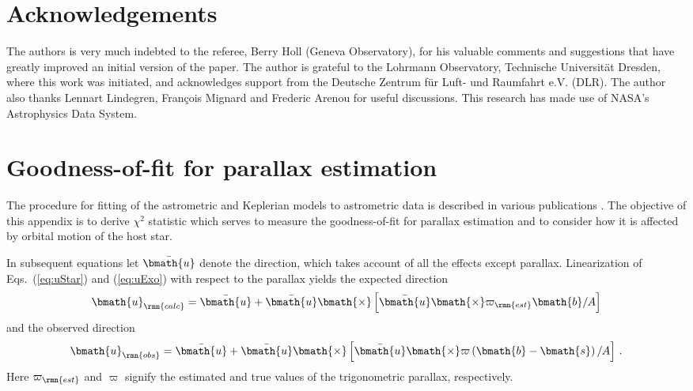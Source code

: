 \documentclass[fleqn,usenatbib,useAMS,usedcolumn]{mnras}
\begin{document}
\section*{Acknowledgements}

The authors is very much indebted to the referee, Berry Holl (Geneva Observatory), for his valuable comments and suggestions that have greatly improved an initial version of the paper. The author is grateful to the Lohrmann Observatory, Technische Universit\"at Dresden, where this work was initiated, and acknowledges support from the Deutsche Zentrum f\"ur Luft- und Raumfahrt e.V. (DLR). The author also thanks Lennart Lindegren, Fran\c{c}ois Mignard and Frederic Arenou for useful discussions. This research has made use of NASA's Astrophysics Data System.






\appendix

\section{Goodness-of-fit for parallax estimation}
\label{app:fitting}

The procedure for fitting of the astrometric and Keplerian models to astrometric data is described in various publications  \citep[e.g.,][]{Casertano+2008,Wright+Howard2009,Perryman+2014,2017arXiv1704.02493}. The objective of this appendix is to derive $\chi^2$ statistic which serves to measure the goodness-of-fit for parallax estimation and to consider how it is affected by orbital motion of the host star.

In subsequent equations let $\bar{\bmath{u}}$ denote the direction, which takes account of all the effects except parallax. Linearization of Eqs.~(\ref{eq:uStar}) and (\ref{eq:uExo}) with respect to the parallax yields the expected direction
\begin{equation}
  \bmath{u}_\rmn{calc}=\bar{\bmath{u}}+
  \bar{\bmath{u}}\bmath{\times}\left[\bar{\bmath{u}}\bmath{\times}\varpi_\rmn{est}\bmath{b}/A\right]
\end{equation}
and the observed direction
\begin{equation}
  \bmath{u}_\rmn{obs}=\bar{\bmath{u}}+
  \bar{\bmath{u}}\bmath{\times}
  \left[
   \bar{\bmath{u}}\bmath{\times}\varpi\left(\bmath{b}-\bmath{s}\right)/A
  \right]\,.
\end{equation}
Here $\varpi_\rmn{est}$ and $\varpi$ signify the estimated and true values of the trigonometric parallax, respectively.
\end{document}
